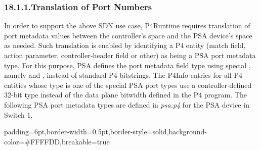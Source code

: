 \documentclass[11pt]{article}
\begin{document}
{%
\subsubsection{18.1.1.\hspace*{0.5em}Translation of Port Numbers}\label{sec-translation-of-port-numbers}%

\noindent{}In order to support the above SDN use case, P4Runtime requires translation of
port metadata values between the controller's space and the PSA device's space
as needed. Such translation is enabled by identifying a P4 entity (match field,
action parameter, controller-header field or other) as being a PSA port metadata
type. For this purpose, PSA defines the port metadata field type using special
, namely  and
, instead of standard P4 bitstrings. The P4Info entries for
all P4 entities whose type is one of the special PSA port types use a
controller-defined 32-bit type instead of the data plane bitwidth defined in the
P4 program. The following PSA port metadata types are defined in \emph{psa.p4} for
the PSA device in Switch 1.%

\begin{mdbmargintb}{6pt}{6pt}%
\begin{mdblock}{padding=6pt,border-width=0.5pt,border-style=solid,background-color=\#FFFFDD,breakable=true}%
\begin{mdpre}%
\end{mdpre}%
\end{mdblock}%
\end{mdbmargintb}%

}
\end{document}
